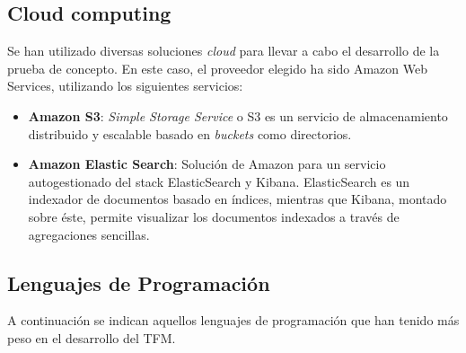 \subsection{Cloud computing}

Se han utilizado diversas soluciones \textit{cloud} para llevar a cabo el
desarrollo de la prueba de concepto. En este caso, el proveedor elegido ha sido
Amazon Web Services, utilizando los siguientes servicios:

\begin{itemize}

\item \textbf{Amazon S3}: \textit{Simple Storage Service} o S3 es un servicio de almacenamiento
  distribuido y escalable basado en \textit{buckets} como directorios.
  
\item \textbf{Amazon Elastic Search}: Solución de Amazon para un servicio autogestionado del stack ElasticSearch y
  Kibana. ElasticSearch es un indexador de documentos basado en índices,
  mientras que Kibana, montado sobre éste, permite visualizar los documentos
  indexados a través de agregaciones sencillas. 
\end{itemize}

\subsection{Lenguajes de Programación}

A continuación se indican aquellos lenguajes de programación que han tenido más
peso en el desarrollo del \acs{TFM}. 


